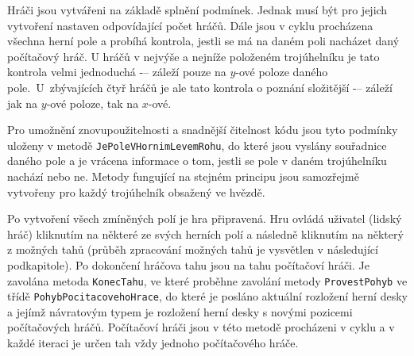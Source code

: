 Hráči jsou vytvářeni na základě splnění podmínek. Jednak musí být pro jejich vytvoření nastaven odpovídající počet hráčů. Dále jsou v cyklu procházena všechna herní pole a probíhá kontrola, jestli se má na daném poli nacházet daný počítačový hráč. U hráčů v nejvýše a nejníže položeném trojúhelníku je tato kontrola velmi jednoduchá -– záleží pouze na $y$-ové poloze daného pole.~U~zbývajících čtyř hráčů je ale tato kontrola o poznání složitější -– záleží jak na $y$-ové poloze, tak na $x$-ové.

Pro umožnění znovupoužitelnosti a snadnější čitelnost kódu jsou tyto podmínky uloženy v metodě \lstinline$JePoleVHornimLevemRohu$, do které jsou vyslány souřadnice daného pole a je vrácena informace o tom, jestli se pole v daném trojúhelníku nachází nebo ne. Metody fungující na stejném principu jsou samozřejmě vytvořeny pro každý trojúhelník obsažený ve hvězdě.

Po vytvoření všech zmíněných polí je hra připravená. Hru ovládá uživatel (lidský hráč) kliknutím na některé ze svých herních polí a následně kliknutím na některý z možných tahů (průběh zpracování možných tahů je vysvětlen v následující podkapitole). Po dokončení hráčova tahu jsou na tahu počítačoví hráči. Je zavolána metoda \lstinline$KonecTahu$, ve které proběhne zavolání metody \lstinline$ProvestPohyb$ ve třídě \lstinline$PohybPocitacovehoHrace$, do které je posláno aktuální rozložení herní desky a jejímž návratovým typem je rozložení herní desky s novými pozicemi počítačových hráčů. Počítačoví hráči jsou v této metodě procházeni v cyklu a v každé iteraci je určen tah vždy jednoho počítačového hráče. 

